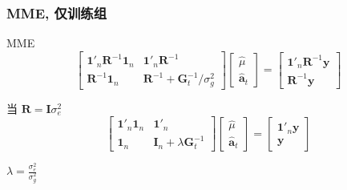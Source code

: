 \documentclass[serif,aspectratio=169]{beamer}
\begin{document}
\begin{frame}
  \frametitle{MME, 仅训练组}
  \begin{block}{MME}
    $$
    \left[\begin{array}{ll}
        \mathbf{1}'_n\mathbf{R}^{-1}\mathbf{1}_n & \mathbf{1}'_n\mathbf{R}^{-1}\\
        \mathbf{R}^{-1}\mathbf{1}_n & \mathbf{R}^{-1}+\mathbf{G}^{-1}_t/\sigma_g^2
      \end{array}\right]
    \left[\begin{array}{c}
        \hat{\mu}\\\hat{\mathbf{a}}_t
      \end{array}\right]=
    \left[\begin{array}{c}
        \mathbf{1}'_n\mathbf{R}^{-1}\mathbf{y}\\\mathbf{R}^{-1}\mathbf{y}
      \end{array}\right]
    $$
  \end{block}
  
  \begin{block}{当 $\mathbf{R=I}\sigma_e^2$}
    $$
    \left[\begin{array}{ll}
        \mathbf{1}'_n\mathbf{1}_n & \mathbf{1}'_n\\
        \mathbf{1}_n & \mathbf{I}_n+\lambda\mathbf{G}^{-1}_t
      \end{array}\right]
    \left[\begin{array}{c}
        \hat{\mu}\\\hat{\mathbf{a}}_t
      \end{array}\right]=
    \left[\begin{array}{c}
        \mathbf{1}'_n\mathbf{y}\\\mathbf{y}
      \end{array}\right]
    $$

    $\lambda=\frac{\sigma_e^2}{\sigma_g^2}$
  \end{block}
\end{frame}
\end{document}

